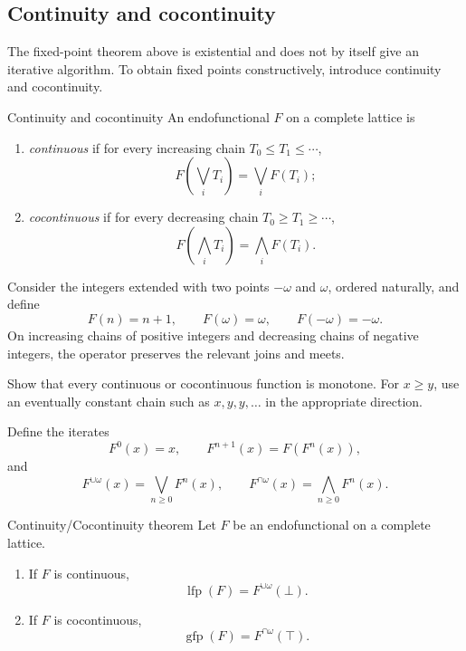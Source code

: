 \documentclass[a4paper]{article}
\newcommand{\lfp}{\operatorname{lfp}}
\newcommand{\gfp}{\operatorname{gfp}}
\begin{document}
\subsection{Continuity and cocontinuity}

The fixed-point theorem above is existential and does not by itself give an iterative algorithm.
To obtain fixed points constructively, introduce continuity and cocontinuity.

\begin{snippetdefinition}{Continuity and cocontinuity}
    An endofunctional \(F\) on a complete lattice is
    \begin{enumerate}
        \item \emph{continuous} if for every increasing chain \(T_0\leq T_1\leq\cdots\),
        \[
            F\left(\bigvee_iT_i\right)
            =
            \bigvee_iF(T_i);
        \]
        \item \emph{cocontinuous} if for every decreasing chain \(T_0\geq T_1\geq\cdots\),
        \[
            F\left(\bigwedge_iT_i\right)
            =
            \bigwedge_iF(T_i).
        \]
    \end{enumerate}
\end{snippetdefinition}

\begin{snippetexample}{}
    Consider the integers extended with two points \(-\omega\) and \(\omega\), ordered naturally, and define
    \[
        F(n)=n+1,
        \qquad
        F(\omega)=\omega,
        \qquad
        F(-\omega)=-\omega.
    \]
    On increasing chains of positive integers and decreasing chains of negative integers, the operator preserves the relevant joins and meets.
\end{snippetexample}

\begin{snippetexercise}{}
    Show that every continuous or cocontinuous function is monotone.
    For \(x\geq y\), use an eventually constant chain such as \(x,y,y,\ldots\) in the appropriate direction.
\end{snippetexercise}

Define the iterates
\[
    F^0(x)=x,
    \qquad
    F^{n+1}(x)=F(F^n(x)),
\]
and
\[
    F^{\cup\omega}(x)=\bigvee_{n\geq0}F^n(x),
    \qquad
    F^{\cap\omega}(x)=\bigwedge_{n\geq0}F^n(x).
\]

\begin{snippettheorem}{Continuity/Cocontinuity theorem}
    Let \(F\) be an endofunctional on a complete lattice.
    \begin{enumerate}
        \item If \(F\) is continuous,
        \[
            \lfp(F)=F^{\cup\omega}(\bot).
        \]
        \item If \(F\) is cocontinuous,
        \[
            \gfp(F)=F^{\cap\omega}(\top).
        \]
    \end{enumerate}
\end{snippettheorem}
\end{document}
